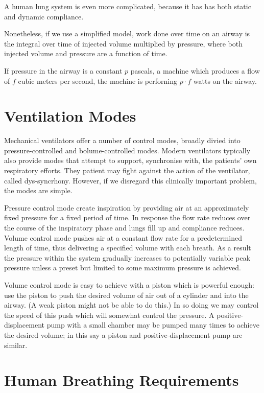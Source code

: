 \documentclass[conference]{article}
\begin{document}
A human lung system is even more
complicated, because it has has
both static and dynamic compliance\cite{west2012respiratory}.

Nonetheless, if we use a simplified model, work done over time
on an airway is the integral over time of injected volume
multiplied by pressure, where both injected volume and
pressure are a function of time.

If pressure in the airway is a constant $p$ pascals, a machine which produces a flow of $f$ cubic meters
per second, the machine is perforning $p \cdot f$ watts on the airway.


\section{Ventilation Modes}

Mechanical ventilators offer a number of control modes,
broadly divied into pressure-controlled and bolume-controlled modes.
Modern ventilators typically also provide modes that attempt to support, synchronise with, the patients' own respiratory efforts.
They patient may fight against the action of the ventilator,
called dys-syncrhony. However, if we disregard this clinically
important problem, the modes are simple.

Pressure control mode create inspiration by providing air
at an approximately fixed pressure for a fixed period of time.
In response the flow rate reduces over the course of the inspiratory
phase and lungs fill up and compliance reduces.
Volume control mode pushes air at a constant flow rate for a predetermined length
of time, thus delivering a specified volume with each breath.
As a result the pressure within the system gradually increases to potentially
variable peak pressure unless a preset but limited to some maximum pressure is achieved.


Volume control mode is easy to achieve with a piston which is
powerful enough: use the piston to push the desired volume of
air out of a cylinder and into the airway. (A weak piston might
not be able to do this.) In so doing we may control the speed
of this push which will somewhat control the pressure.
A positive-displacement pump with a small chamber may be pumped
many times to achieve the desired volume; in this say a
piston and positive-displacement pump are similar.

\section{Human Breathing Requirements}
\end{document}
